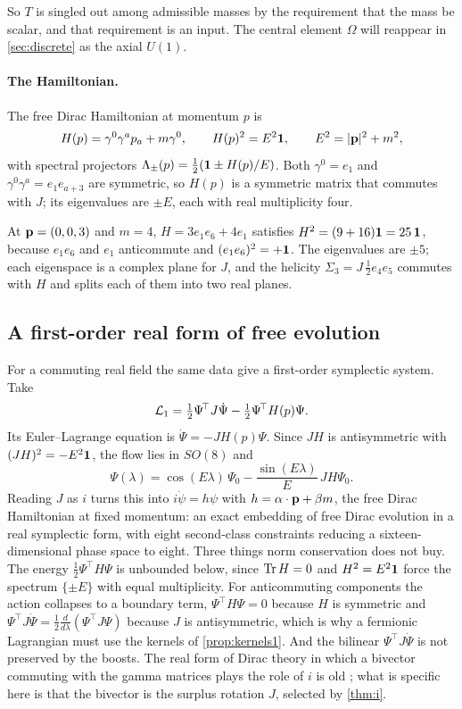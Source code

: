 So $T$ is singled out among admissible masses by the requirement that the mass be scalar, and that requirement is an input. The
central element $\Omega$ will reappear in \cref{sec:discrete} as the axial $U(1)$.

\paragraph{The Hamiltonian.} The free Dirac Hamiltonian at momentum $p$ is
\begin{equation}
\label{eq:Hp}
H(p)=\gamma^0\gamma^ap_a+m\gamma^0,\qquad H(p)^2=E^2\mathbf 1,\qquad E^2=|\mathbf p|^2+m^2 ,
\end{equation}
with spectral projectors $\Lambda_\pm(p)=\tfrac12(\mathbf 1\pm H(p)/E)$. Both $\gamma^0=e_1$ and $\gamma^0\gamma^a=e_1e_{a+3}$ are symmetric, so
$H(p)$ is a symmetric matrix that commutes with $J$; its eigenvalues are $\pm E$, each with real multiplicity four.

\begin{example}
\label{ex:Hp}
At $\mathbf p=(0,0,3)$ and $m=4$, $H=3e_1e_6+4e_1$ satisfies $H^2=(9+16)\mathbf 1=25\,\mathbf 1$, because $e_1e_6$ and $e_1$ anticommute and
$(e_1e_6)^2=+\mathbf 1$. The eigenvalues are $\pm5$; each eigenspace is a complex plane for $J$, and the helicity
$\Sigma_3=J\,\tfrac12e_4e_5$ commutes with $H$ and splits each of them into two real planes.
\end{example}

\subsection{A first-order real form of free evolution}

For a commuting real field the same data give a first-order symplectic system. Take
\[
\mathcal L_1=\tfrac12\Psi^{\!\top}J\dot\Psi-\tfrac12\Psi^{\!\top}H(p)\Psi .
\]
Its Euler--Lagrange equation is $\dot\Psi=-JH(p)\Psi$. Since $JH$ is antisymmetric with $(JH)^2=-E^2\mathbf 1$, the flow lies in $SO(8)$ and
\[
\Psi(\lambda)=\cos(E\lambda)\,\Psi_0-\frac{\sin(E\lambda)}{E}\,JH\Psi_0 .
\]
Reading $J$ as $i$ turns this into $i\dot\psi=h\psi$ with $h=\alpha\cdot\mathbf p+\beta m$, the free Dirac Hamiltonian at fixed momentum: an exact
embedding of free Dirac evolution in a real symplectic form, with eight second-class constraints reducing a sixteen-dimensional phase
space to eight. Three things norm conservation does not buy. The energy $\tfrac12\Psi^{\!\top}H\Psi$ is unbounded below, since $\operatorname{Tr} H=0$
and $H^2=E^2\mathbf 1$ force the spectrum $\{\pm E\}$ with equal multiplicity. For anticommuting components the action collapses to a boundary
term, $\Psi^{\!\top}H\Psi=0$ because $H$ is symmetric and $\Psi^{\!\top}J\dot\Psi=\tfrac12\tfrac{d}{d\lambda}(\Psi^{\!\top}J\Psi)$ because $J$ is
antisymmetric, which is why a fermionic Lagrangian must use the kernels of \cref{prop:kernels1}. And the bilinear $\Psi^{\!\top}J\dot\Psi$
is not preserved by the boosts. The real form of Dirac theory in which a bivector commuting with the gamma matrices plays the role of $i$
is old \cite{Hestenes67}; what is specific here is that the bivector is the surplus rotation $J$, selected by \cref{thm:i}.
